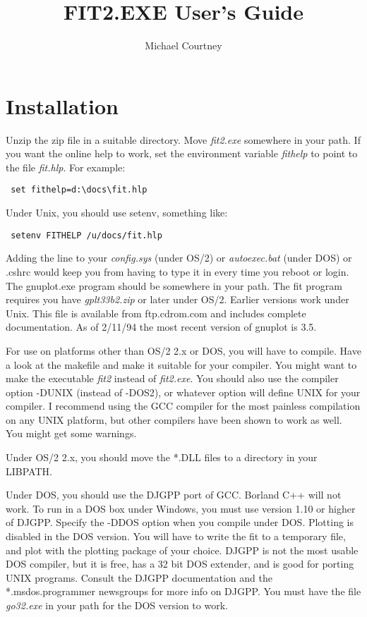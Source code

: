 \title{FIT2.EXE User's Guide}
\author{Michael Courtney}



\maketitle
\newpage

\tableofcontents

\newpage
\section{Installation}

 Unzip the zip file in a suitable directory.  Move
 {\em fit2.exe} somewhere in your path.  If you want the online
 help to work, set the environment variable {\em fithelp} to
 point to the file {\em fit.hlp}.  For example:\\
 \begin{verbatim}
 set fithelp=d:\docs\fit.hlp
 \end{verbatim}
 Under Unix, you should use setenv, something like:\\
 \begin{verbatim}
 setenv FITHELP /u/docs/fit.hlp
 \end{verbatim}
 Adding the line to your {\em config.sys} (under OS/2) or 
 {\em autoexec.bat} (under DOS) or .cshrc would keep you from 
 having to type it in every time you reboot or login.  
 The gnuplot.exe program should be somewhere in your path.
 The fit program requires you have {\em gplt33b2.zip} or later
 under OS/2.  Earlier versions work under Unix. This file 
 is available from ftp.cdrom.com and includes complete 
 documentation.  As of 2/11/94 the most recent version of
 gnuplot is 3.5.

 For use on platforms other than OS/2 2.x or DOS, you will
 have to compile. Have a look at the makefile and make it 
 suitable for your compiler. You might want to make the 
 executable {\em fit2} instead of {\em fit2.exe}. You should also use 
 the compiler option -DUNIX (instead of -DOS2), or whatever
 option will define UNIX for your compiler.  I recommend
 using the GCC compiler for the most painless compilation
 on any UNIX platform, but other compilers have been shown
 to work as well.  You might get some warnings.
 
 Under OS/2 2.x, you should move the *.DLL files to a directory
 in your LIBPATH.

 Under DOS, you should use the DJGPP port of GCC.  Borland 
 C++ will not work.  To run in a DOS box under Windows, you
 must use version 1.10 or higher of DJGPP.  Specify the 
 -DDOS option when you compile under DOS.  Plotting is 
 disabled in the DOS version.  You will have to write the 
 fit to a temporary file, and plot with the plotting 
 package of your choice.  DJGPP is not the most usable DOS 
 compiler, but it is free, has a 32 bit DOS extender, and 
 is good for porting UNIX programs.  Consult the DJGPP 
 documentation and the *.msdos.programmer newsgroups for 
 more info on DJGPP.  You must have the file {\em go32.exe} in 
 your path for the DOS version to work.

